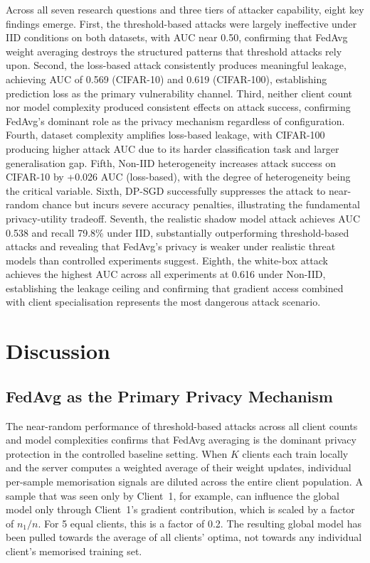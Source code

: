 \documentclass[12pt, a4paper]{report}
\begin{document}
Across all seven research questions and three tiers of attacker capability, eight
key findings emerge. First, the threshold-based attacks were largely
ineffective under IID conditions on both datasets, with AUC near 0.50, confirming
that FedAvg weight averaging destroys the structured patterns that threshold
attacks rely upon. Second, the loss-based attack consistently produces meaningful
leakage, achieving AUC of 0.569 (CIFAR-10) and 0.619 (CIFAR-100), establishing
prediction loss as the primary vulnerability channel. Third, neither client count
nor model complexity produced consistent effects on attack success, confirming
FedAvg's dominant role as the privacy mechanism regardless of configuration.
Fourth, dataset complexity amplifies loss-based leakage, with CIFAR-100 producing
higher attack AUC due to its harder classification task and larger generalisation
gap. Fifth, Non-IID heterogeneity increases attack success on CIFAR-10 by +0.026
AUC (loss-based), with the degree of heterogeneity being the critical variable.
Sixth, DP-SGD successfully suppresses the attack to near-random chance but incurs
severe accuracy penalties, illustrating the fundamental privacy-utility tradeoff.
Seventh, the realistic shadow model attack achieves AUC 0.538 and recall 79.8\%
under IID, substantially outperforming threshold-based attacks and revealing that
FedAvg's privacy is weaker under realistic threat models than controlled experiments
suggest. Eighth, the white-box attack achieves the highest AUC across all
experiments at 0.616 under Non-IID, establishing the leakage ceiling and confirming
that gradient access combined with client specialisation represents the most
dangerous attack scenario.

\chapter{Discussion}

\section{FedAvg as the Primary Privacy Mechanism}

The near-random performance of threshold-based attacks across all
client counts and model complexities confirms that FedAvg averaging is the dominant privacy protection in the controlled baseline
setting. When $K$ clients each train locally and the server computes a weighted
average of their weight updates, individual per-sample memorisation signals are
diluted across the entire client population. A sample that was seen only by
Client~1, for example, can influence the global model only through Client~1's
gradient contribution, which is scaled by a factor of $n_1 / n$. For 5 equal
clients, this is a factor of 0.2. The resulting global model has been pulled
towards the average of all clients' optima, not towards any individual client's
memorised training set.
\end{document}
